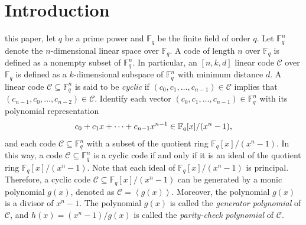 \documentclass[journal,onecolumn]{IEEEtran}
\begin{document}
\maketitle
\date{\today}
\section{Introduction}

 this paper, let $q$ be a prime power  and   $\mathbb{F}_q$ be the finite field of order $q$. Let $\mathbb{F}_q^n$ denote  the $n$-dimensional linear space over $\mathbb{F}_q.$ A code of length $n$ over $\mathbb{F}_q$ is defined as a nonempty subset of $\mathbb{F}_q^n$. In particular,
an $[n,k,d]$  linear code $\mathcal{C}$ over $\mathbb{F}_q$ is defined as a $k$-dimensional  subspace of $\mathbb{F}_q^n$  with  minimum distance $d$. A  linear code $\mathcal{C}\subseteq \mathbb{F}_{q}^n$  is said to be  \textit{cyclic} if $(c_{0},c_{1},\ldots,c_{n-1})\in \mathcal{C}$ implies that $(c_{n-1},c_{0},\ldots,c_{n-2})\in \mathcal{C}.$ 
Identify each vector $(c_0,c_1,\ldots,c_{n-1})\in  \mathbb{F}_q^n$  with  its polynomial representation \begin{equation}\notag
c_0+c_1x+\cdots+c_{n-1}x^{n-1} \in \mathbb{F}_q[x]/(x^n-1),
\end{equation}
and  each  code $\mathcal{C}\subseteq \mathbb{F}_q^n$  with  a subset of  the quotient ring $\mathbb{F}_q[x]/(x^n-1).$ In this way, a code $\mathcal{C}\subseteq \mathbb{F}_q^n$  is a  cyclic code if and only if it is an ideal of the quotient ring $\mathbb{F}_q[x]/(x^n-1).$ 
 Note that each ideal of $\mathbb{F}_q[x]/(x^n-1)$ is principal.  
 Therefore, a cyclic  code $\mathcal{C}\subseteq \mathbb{F}_q[x]/(x^n-1)$  can be generated by  a monic polynomial $g(x)$,  denoted as  $\mathcal{C}=\left \langle g(x) \right \rangle. $ Moreover,   the polynomial  $g(x)$ is a divisor of $x^n-1$.  The polynomial $g(x)$ is called the \textit{generator polynomial} of $\mathcal{C}$, and $h(x)=(x^n-1)/{g(x)}$ is called the 
 \textit{parity-check polynomial} of $\mathcal{C}$.
\end{document}
